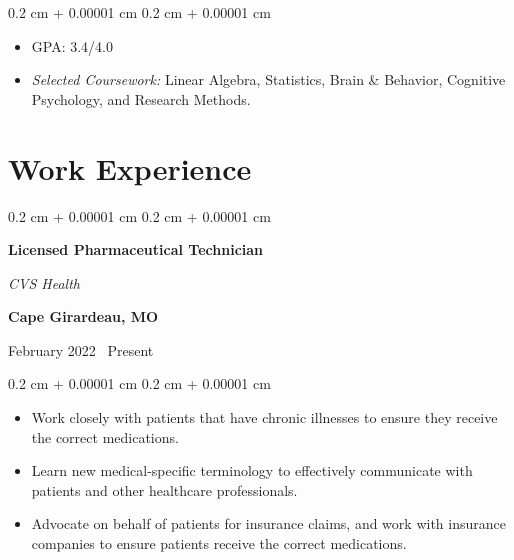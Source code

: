 \documentclass[10pt, letterpaper]{article}
\newenvironment{highlights}{
    \begin{itemize}[
        topsep=0.10 cm,
        parsep=0.10 cm,
        partopsep=0pt,
        itemsep=0pt,
        leftmargin=0.4 cm + 10pt
    ]
}{
    \end{itemize}
} %
\newenvironment{onecolentry}{
    \begin{adjustwidth}{
        0.2 cm + 0.00001 cm
    }{
        0.2 cm + 0.00001 cm
    }
}{
    \end{adjustwidth}
} %
\newenvironment{twocolentry}[2][]{
    \onecolentry
    \def\secondColumn{#2}
    \setcolumnwidth{\fill, 4.5 cm}
    \begin{paracol}{2}
}{
    \switchcolumn \raggedleft \secondColumn
    \end{paracol}
    \endonecolentry
} %
\begin{document}
\vspace{0.10 cm}

\begin{onecolentry}
    \begin{highlights}
        \item GPA: 3.4/4.0
        \item \textit{Selected Coursework:} Linear Algebra, Statistics, Brain \& Behavior, Cognitive Psychology, and Research Methods.
    \end{highlights}
\end{onecolentry}






\section{Work Experience}

\begin{samepage}

    \begin{twocolentry}{
            \textbf{Cape Girardeau, MO}

            February 2022 \textendash\ Present}
        \textbf{Licensed Pharmaceutical Technician}

        \textit{CVS Health}
    \end{twocolentry}

    \vspace{0.10 cm}
    \begin{onecolentry}
        \begin{highlights}
            \item Work closely with patients that have chronic illnesses to ensure they receive the correct medications.
            \item Learn new medical-specific terminology to effectively communicate with patients and other healthcare professionals.
            \item Advocate on behalf of patients for insurance claims, and work with insurance companies to ensure patients receive the correct medications.
        \end{highlights}
    \end{onecolentry}
\end{samepage}
\end{document}
